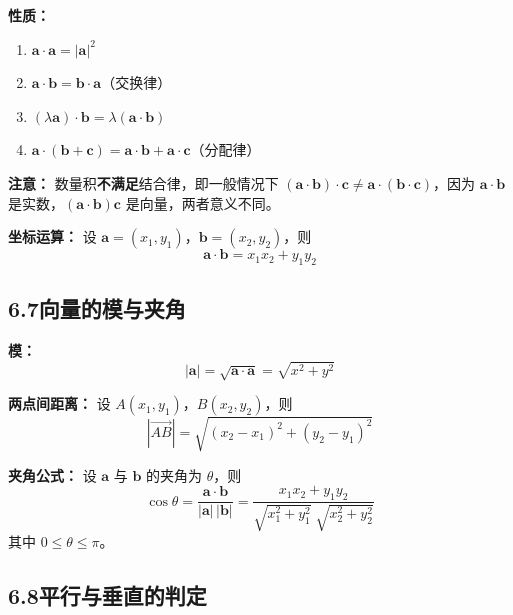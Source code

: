 \documentclass[12pt, a4paper]{ctexart}
\begin{document}
\begin{knowledgebox}[数量积的性质与运算律]
\textbf{性质：}
\begin{enumerate}[leftmargin=2em]
  \item $\boldsymbol{a}\cdot\boldsymbol{a}=|\boldsymbol{a}|^2$
  \item $\boldsymbol{a}\cdot\boldsymbol{b}=\boldsymbol{b}\cdot\boldsymbol{a}$（交换律）
  \item $(\lambda\boldsymbol{a})\cdot\boldsymbol{b}=\lambda(\boldsymbol{a}\cdot\boldsymbol{b})$
  \item $\boldsymbol{a}\cdot(\boldsymbol{b}+\boldsymbol{c})=\boldsymbol{a}\cdot\boldsymbol{b}+\boldsymbol{a}\cdot\boldsymbol{c}$（分配律）
\end{enumerate}

\textbf{注意：} 数量积\textbf{不满足}结合律，即一般情况下 $(\boldsymbol{a}\cdot\boldsymbol{b})\cdot\boldsymbol{c}\neq\boldsymbol{a}\cdot(\boldsymbol{b}\cdot\boldsymbol{c})$，因为 $\boldsymbol{a}\cdot\boldsymbol{b}$ 是实数，$(\boldsymbol{a}\cdot\boldsymbol{b})\boldsymbol{c}$ 是向量，两者意义不同。

\textbf{坐标运算：} 设 $\boldsymbol{a}=(x_1,y_1)$，$\boldsymbol{b}=(x_2,y_2)$，则
\[
\boldsymbol{a}\cdot\boldsymbol{b}=x_1 x_2+y_1 y_2
\]
\end{knowledgebox}

\subsection*{6.7\quad 向量的模与夹角}

\begin{knowledgebox}[模与夹角公式]
\textbf{模：}
\[
|\boldsymbol{a}|=\sqrt{\boldsymbol{a}\cdot\boldsymbol{a}}=\sqrt{x^2+y^2}
\]

\textbf{两点间距离：} 设 $A(x_1,y_1)$，$B(x_2,y_2)$，则
\[
|\overrightarrow{AB}|=\sqrt{(x_2-x_1)^2+(y_2-y_1)^2}
\]

\textbf{夹角公式：} 设 $\boldsymbol{a}$ 与 $\boldsymbol{b}$ 的夹角为 $\theta$，则
\[
\cos\theta=\frac{\boldsymbol{a}\cdot\boldsymbol{b}}{|\boldsymbol{a}|\,|\boldsymbol{b}|}=\frac{x_1 x_2+y_1 y_2}{\sqrt{x_1^2+y_1^2}\;\sqrt{x_2^2+y_2^2}}
\]
其中 $0\leqslant\theta\leqslant\pi$。
\end{knowledgebox}

\subsection*{6.8\quad 平行与垂直的判定}
\end{document}
